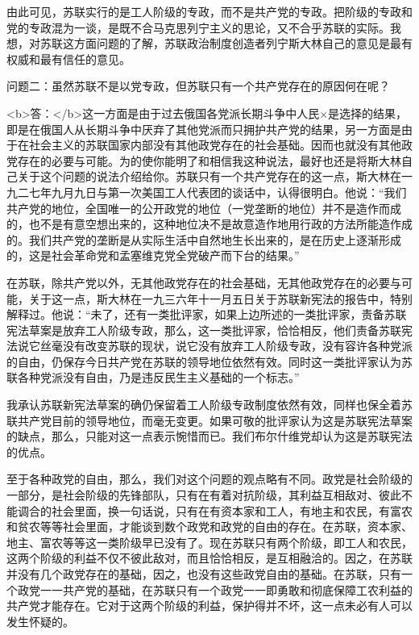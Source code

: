 由此可见，苏联实行的是工人阶级的专政，而不是共产党的专政。把阶级的专政和党的专政混为一谈，是既不合马克思列宁主义的思论，又不合乎苏联的实际。我想，对苏联这方面问题的了解，苏联政治制度创造者列宁斯大林自己的意见是最有权威和最有信任的意见。

问题二：虽然苏联不是以党专政，但苏联只有一个共产党存在的原因何在呢？

<b>答：</b>这一方面是由于过去俄国各党派长期斗争中人民×是选择的结果，即是在俄国人从长期斗争中厌弃了其他党派而只拥护共产党的结果，另一方面是由于在社会主义的苏联国家内部没有其他政党存在的社会基础。因而也就没有其他政党存在的必要与可能。为的使你能明了和相信我这种说法，最好也还是将斯大林自己关于这个问题的说法介绍给你。苏联只有一个共产党存在的这一点，斯大林在一九二七年九月九日与第一次美国工人代表团的谈话中，认得很明白。他说：“我们共产党的地位，全国唯一的公开政党的地位（一党垄断的地位）并不是造作而成的，也不是有意空想出来的，这种地位决不是故意造作地用行政的方法所能造作成的。我们共产党的垄断是从实际生活中自然地生长出来的，是在历史上逐渐形成的，这是社会革命党和孟塞维克党全党破产而下台的结果。”

在苏联，除共产党以外，无其他政党存在的社会基础，无其他政党存在的必要与可能，关于这一点，斯大林在一九三六年十一月五日关于苏联新宪法的报告中，特别解释过。他说：“未了，还有一类批评家，如果上边所述的一类批评家，责备苏联宪法草案是放弃工人阶级专政，那么，这一类批评家，恰恰相反，他们责备苏联宪法说它丝毫没有改变苏联的现状，说它没有放弃工人阶级专政，没有容许各种党派的自由，仍保存今日共产党在苏联的领导地位依然有效。同时这一类批评家认为苏联各种党派没有自由，乃是违反民生主义基础的一个标志。”

我承认苏联新宪法草案的确仍保留着工人阶级专政制度依然有效，同样也保全着苏联共产党目前的领导地位，而毫无变更。如果可敬的批评家认为这是苏联宪法草案的缺点，那么，只能对这一点表示惋惜而已。我们布尔什维党却认为这是苏联宪法的优点。

至于各种政党的自由，那么，我们对这个问题的观点略有不同。政党是社会阶级的一部分，是社会阶级的先锋部队，只有在有着对抗阶级，其利益互相敌对、彼此不能调合的社会里面，换一句话说，只有在有资本家和工人，有地主和农民，有富农和贫农等等社会里面，才能谈到数个政党和政党的自由的存在。在苏联，资本家、地主、富农等等这一类阶级早已没有了。现在苏联只有两个阶级，即工人和农民，这两个阶级的利益不仅不彼此敌对，而且恰恰相反，是互相融洽的。因之，在苏联并没有几个政党存在的基础，因之，也没有这些政党自由的基础。在苏联，只有一个政党一一共产党的基础，在苏联只有一个政党一一即勇敢和彻底保障工农利益的共产党才能存在。它对于这两个阶级的利益，保护得并不坏，这一点未必有人可以发生怀疑的。

